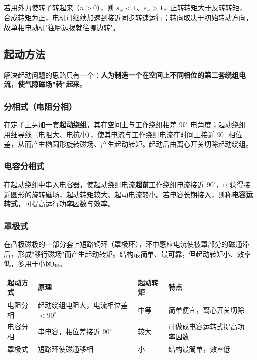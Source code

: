 若用外力使转子转起来（$n>0$），则 $s_+<1$、$s_->1$，正转转矩大于反转转矩，合成转矩为正，电机可继续加速到接近同步转速运行；转向取决于初始转动方向，故单相电动机"往哪边拨就往哪边转"。

\subsection{起动方法}
解决起动问题的思路只有一个：\textbf{人为制造一个在空间上不同相位的第二套绕组电流，使气隙磁场"转"起来}。

\subsubsection{分相式（电阻分相）}
在定子上另加一套\textbf{起动绕组}，其在空间上与工作绕组相差 $90^\circ$ 电角度；起动绕组用细导线（电阻大、电抗小），使其电流与工作绕组电流在时间上接近 $90^\circ$ 相位差，从而产生椭圆形旋转磁场、产生起动转矩。起动后由离心开关切除起动绕组。

\subsubsection{电容分相式}
在起动绕组中串入电容器，使起动绕组电流\textbf{超前}工作绕组电流接近 $90^\circ$，可获得接近圆形的旋转磁场，起动转矩较大、起动电流较小。若电容长期接入，则称\textbf{电容运转式}，可提高运行功率因数与效率。

\subsubsection{罩极式}
在凸极磁极的一部分套上短路铜环（罩极环），环中感应电流使被罩部分的磁通滞后，形成"移行磁场"而产生起动转矩。结构最简单、最可靠，但起动转矩小、效率低，多用于小风扇。

\begin{center}
\begin{tabular}{@{}p{2.2cm}p{3.6cm}p{3.2cm}p{3.4cm}@{}}
\toprule
起动方式 & 原理 & 起动转矩 & 特点 \\
\midrule
电阻分相 & 起动绕组电阻大，电流相位差 $<90^\circ$ & 中等 & 简单便宜，离心开关切除 \\
电容分相 & 串电容，相位差接近 $90^\circ$ & 较大 & 可做成电容运转式提高功率因数 \\
罩极式 & 短路环使磁通移相 & 小 & 结构最简单，效率低 \\
\bottomrule
\end{tabular}
\end{center}


